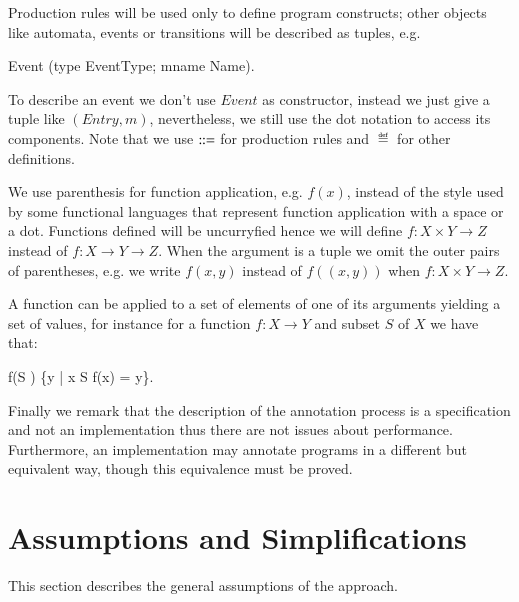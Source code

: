 \documentclass[a4paper,10pt]{article}
\begin{document}
Production rules will be used only to define program constructs; other objects like automata, events or
transitions will be described as tuples, e.g.
\begin{haskell}
Event \eqdef (type \colon EventType; mname \colon Name).
\end{haskell}
To describe an event we don't use $Event$ as constructor, instead we just give a tuple like $(Entry, m)$,
nevertheless, we still use the dot notation to access its components.
Note that we use $::=$ for production rules and $\eqdef$ for other definitions.

We use parenthesis for function application, e.g. $f(x)$, instead of the style used by some functional
languages that represent function application with a space or a dot. 
Functions defined  will be uncurryfied hence we will define $f \colon X \times Y \to Z$ instead of $f \colon X
\to Y \to Z$.
When the argument is a tuple we omit the outer pairs of parentheses, e.g. we write $f(x,y)$ instead of
$f((x,y))$ when $f \colon X \times Y \to Z$. 

A function can be applied to a set of elements of one of its arguments yielding a set of values, for instance
for a function $f \colon X \to Y$ and subset $S$ of $X$ we have that:
\begin{haskell}
  f(\cdot S \cdot) \eqdef \{y | x \in S \wedge f(x) = y\}.  
\end{haskell}

Finally we remark that the description of the annotation process is a specification and not an implementation
thus there are not issues about performance. Furthermore, an implementation may annotate programs in a
different but equivalent way, though this equivalence must be proved.


\section{Assumptions and Simplifications}\label{sec:Assumptions}
This section describes the general assumptions of the approach.
\end{document}
